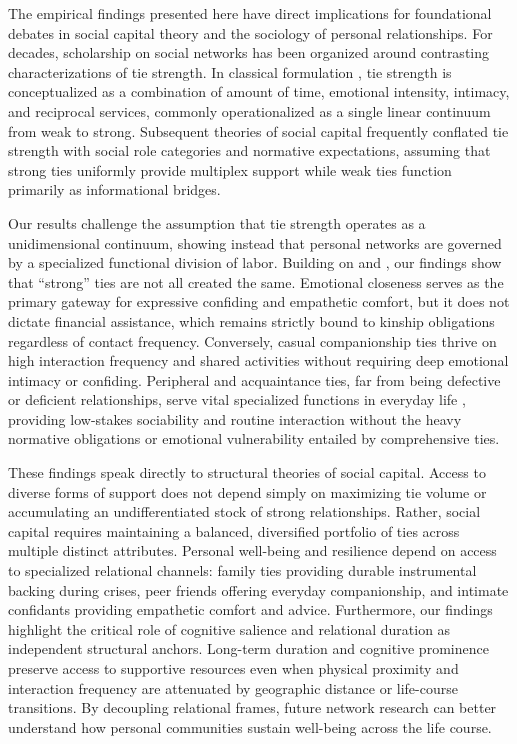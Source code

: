 \documentclass[12pt]{article}
\begin{document}
The empirical findings presented here have direct implications for foundational debates in social capital theory and the sociology of personal relationships. For decades, scholarship on social networks has been organized around contrasting characterizations of tie strength. In classical formulation \citep{granovetter1973strength}, tie strength is conceptualized as a combination of amount of time, emotional intensity, intimacy, and reciprocal services, commonly operationalized as a single linear continuum from weak to strong. Subsequent theories of social capital \citep{coleman1988social,lin2001social} frequently conflated tie strength with social role categories and normative expectations, assuming that strong ties uniformly provide multiplex support while weak ties function primarily as informational bridges.

Our results challenge the assumption that tie strength operates as a unidimensional continuum, showing instead that personal networks are governed by a specialized functional division of labor. Building on \citet{lizardo2024theorizing} and \citet{marsden1984measuring}, our findings show that ``strong'' ties are not all created the same. Emotional closeness serves as the primary gateway for expressive confiding and empathetic comfort, but it does not dictate financial assistance, which remains strictly bound to kinship obligations regardless of contact frequency. Conversely, casual companionship ties thrive on high interaction frequency and shared activities without requiring deep emotional intimacy or confiding. Peripheral and acquaintance ties, far from being defective or deficient relationships, serve vital specialized functions in everyday life \citep{small2017someone}, providing low-stakes sociability and routine interaction without the heavy normative obligations or emotional vulnerability entailed by comprehensive ties.

These findings speak directly to structural theories of social capital. Access to diverse forms of support does not depend simply on maximizing tie volume or accumulating an undifferentiated stock of strong relationships. Rather, social capital requires maintaining a balanced, diversified portfolio of ties across multiple distinct attributes. Personal well-being and resilience depend on access to specialized relational channels: family ties providing durable instrumental backing during crises, peer friends offering everyday companionship, and intimate confidants providing empathetic comfort and advice. Furthermore, our findings highlight the critical role of cognitive salience and relational duration as independent structural anchors. Long-term duration and cognitive prominence preserve access to supportive resources even when physical proximity and interaction frequency are attenuated by geographic distance or life-course transitions. By decoupling relational frames, future network research can better understand how personal communities sustain well-being across the life course.



\end{document}
